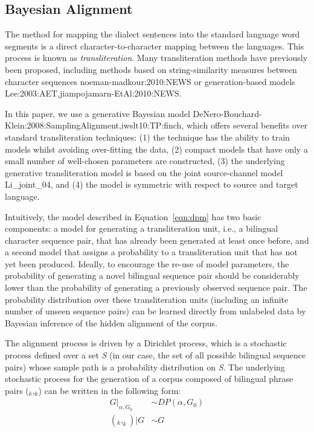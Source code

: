 \documentclass[english]{jnlp_1.4}
\newcommand{\phrase}[1]{}
\renewcommand{\shortcite}{}
\begin{document}
\subsection{Bayesian Alignment}
\label{sec:dialect:segmentation}

 The method for mapping the dialect sentences into the standard language word segments
 is a direct character-to-character mapping between the languages. This process is known as {\em transliteration}.
 Many transliteration methods have previously been proposed, including methods based on string-similarity measures
 between character sequences \shortcite{noeman-madkour:2010:NEWS} or generation-based models
 \shortcite{Lee:2003:AET,jiampojamarn-EtAl:2010:NEWS}.

 In this paper, we use a generative Bayesian model \shortcite{DeNero-Bouchard-Klein:2008:SamplingAlignment,iwslt10:TP:finch},
 which offers several benefits over standard transliteration techniques:
 (1) the technique has the ability to train models whilst avoiding over-fitting the data,
 (2) compact models that have only a small number of well-chosen parameters are constructed,
 (3) the underlying generative transliteration model is based on the joint source-channel model \shortcite{Li_joint_04}, and
 (4) the model is symmetric with respect to source and target language. 

 Intuitively, the model described in Equation~\ref{eqn:dpm} has two basic components: a model for generating a transliteration unit,
 i.e., a bilingual character sequence pair, that has already been generated at least once before, and a second model that assigns
 a probability to a transliteration unit that has not yet been produced.
 Ideally, to encourage the re-use of model parameters, the probability of generating a novel bilingual sequence pair
 should be considerably lower than the probability of generating a previously observed sequence pair. 
 The probability distribution over these transliteration units (including an infinite number of unseen sequence pairs)
 can be learned directly from unlabeled data by Bayesian inference of the hidden alignment of the corpus. 

 The alignment process is driven by a Dirichlet process, which is a stochastic process defined over a set {\em S}
 (in our case, the set of all possible bilingual sequence pairs) whose sample path is a probability distribution on {\em S}. 
 The underlying stochastic process for the generation of a corpus composed of bilingual phrase pairs ($\phrase{s}_{k}$,$\phrase{t}_{k}$)
 can be written in the following form:
\begin{align}
   G|_{\alpha,G_0} & \sim  DP(\alpha, G_0) \nonumber \\
   (\phrase{s}_{k}, \phrase{t}_{k})|G & \sim  G
\end{align}
\end{document}
